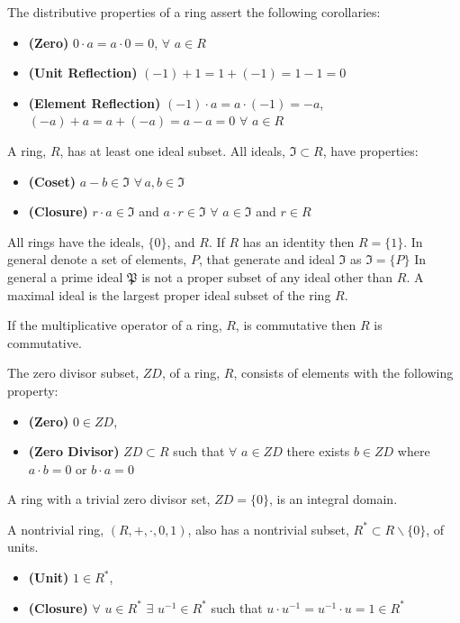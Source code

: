 \documentclass[aps,twocolumn,secnumarabic,nobalancelastpage,amsmath,amssymb,
nofootinbib,parskip=full]{revtex4}
\begin{document}
The distributive properties of a ring assert the following corollaries:

\begin{itemize}
\item \textbf{\small (Zero)} $0\cdot a=a\cdot 0=0$, $\forall$ $a\in R$
\item \textbf{\small (Unit Reflection)} $(-1)+1=1+(-1)=1-1=0$
\item \textbf{\small (Element Reflection)} $(-1)\cdot a=a\cdot (-1)=-a$, 
$(-a)+a=a+(-a)=a-a=0$ $\forall$ $a\in R$
\end{itemize}

A ring, $R$, has at least one ideal subset. All ideals, 
$\mathfrak{I}\subset R$, have properties:

\begin{itemize}
\item \textbf{(Coset)} $a-b\in \mathfrak{I}\,\,\forall\, a,b\in\mathfrak{I}$
\item \textbf{(Closure)} $r\cdot a\in \mathfrak{I}$ and
  $a\cdot r\in\mathfrak{I}$ $\forall$ $a\in\mathfrak{I}$ and $r\in R$
\end{itemize}

All rings have the ideals, $\{0\}$, and $R$. If $R$ has an identity 
then $R=\{1\}$. In general denote a set of elements, $P$,
that generate and ideal $\mathfrak{I}$ as $\mathfrak{I}=\{P\}$ 
In general a prime ideal $\mathfrak{P}$ is not a proper subset 
of any ideal other than $R$. A maximal ideal is the largest 
proper ideal subset of the ring $R$.

If the multiplicative operator of a ring, $R$, is commutative then $R$ is commutative.

The zero divisor subset, $ZD$, of a ring, $R$,
consists of elements with the following property:

\begin{itemize}
\item \textbf{\small (Zero)} $0\in ZD$,
\item \textbf{\small (Zero Divisor)} $ZD\subset R$
  such that $\forall$ $a\in ZD$ there exists $b\in ZD$ where
  $a\cdot b=0$ or $b\cdot a=0$
\end{itemize}

A ring with a trivial zero divisor set, $ZD=\{0\}$, is an integral domain.

A nontrivial ring, $(R,+,\cdot,0,1)$, also has a nontrivial subset,
$R^*\subset R\backslash\{0\}$, of units.

\begin{itemize}
\item \textbf{\small (Unit)} $1\in R^*$, 
\item \textbf{\small (Closure)} $\forall$ $u\in R^*$ $\exists$ $u^{-1}\in R^*$
  such that $u\cdot u^{-1}=u^{-1}\cdot u=1\in R^*$
\end{itemize}
\end{document}
